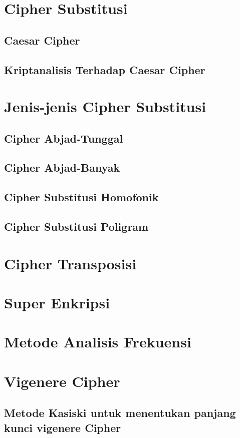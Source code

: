 \documentclass{book}
\begin{document}
    \section{Cipher Substitusi}
        \subsection{Caesar Cipher}
        \subsection{Kriptanalisis Terhadap Caesar Cipher}
    \section{Jenis-jenis Cipher Substitusi}
         \subsection{Cipher Abjad-Tunggal}
         \subsection{Cipher Abjad-Banyak}
         \subsection{Cipher Substitusi Homofonik}
         \subsection{Cipher Substitusi Poligram}         
    \section{Cipher Transposisi}
    \section{Super Enkripsi}
    \section{Metode Analisis Frekuensi}
    \section{Vigenere Cipher}
        \subsection{Metode Kasiski untuk menentukan panjang kunci vigenere Cipher}
\end{document}
